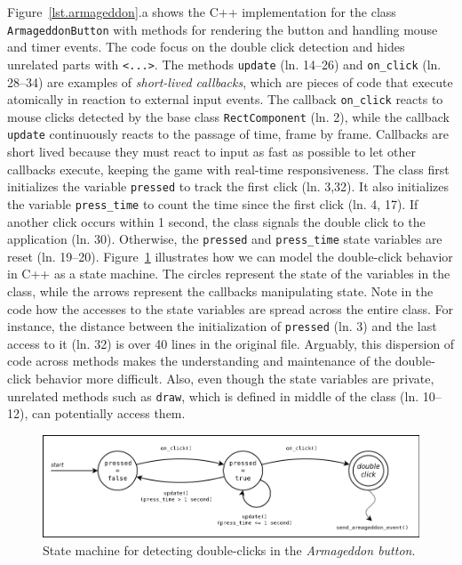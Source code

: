 \documentclass{vgtc}                          %
\newcommand{\code}[1] {{\small{\texttt{#1}}}}
\begin{document}
Figure~\ref{lst.armageddon}.a shows the C++ implementation for the class
\code{ArmageddonButton} with methods for rendering the button and handling
mouse and timer events.
The code focus on the double click detection and hides unrelated parts with
\code{<...>}.
%
The methods \code{update} (ln. 14--26) and \code{on\_click} (ln. 28--34) are
examples of \emph{short-lived callbacks}, which are pieces of code that execute
atomically in reaction to external input events.
The callback \code{on\_click} reacts to mouse clicks detected by the base class
\code{RectComponent} (ln. 2), while the callback \code{update} continuously
reacts to the passage of time, frame by frame.
Callbacks are short lived because they must react to input as fast as possible
to let other callbacks execute, keeping the game with real-time responsiveness.
%
The class first initializes the variable \code{pressed} to track the first
click (ln. 3,32).
It also initializes the variable \code{press\_time} to count the time since the
first click (ln. 4, 17).
If another click occurs within 1 second, the class signals the double click to
the application (ln. 30).
Otherwise, the \code{pressed} and \code{press\_time} state variables are reset
(ln. 19--20). 
%
Figure~\ref{fig.armageddon.fsm} illustrates how we can model the double-click 
behavior in C++ as a state machine.
The circles represent the state of the variables in the class, while the arrows 
represent the callbacks manipulating state.
%
Note in the code how the accesses to the state variables are spread
across the entire class.
For instance, the distance between the initialization of \code{pressed} (ln.
3) and the last access to it (ln. 32) is over 40 lines in the original file.
Arguably, this dispersion of code across methods makes the understanding and 
maintenance of the double-click behavior more difficult.
Also, even though the state variables are private, unrelated methods such as 
\code{draw}, which is defined in middle of the class (ln. 10--12), can
potentially access them.

\begin{figure}[t]
\centering
\includegraphics[width=\columnwidth]{double-click}
\caption{State machine for detecting double-clicks in the
         \emph{Armageddon button}.
\label{fig.armageddon.fsm}
}
\end{figure}
\end{document}
